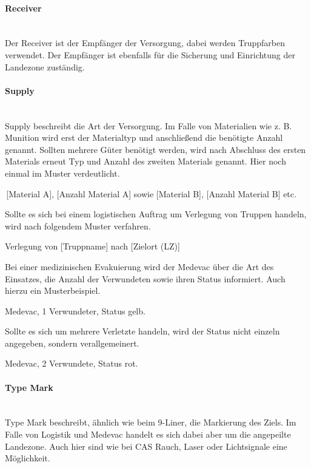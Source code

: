 \paragraph*{Receiver}\hfil\\
Der Receiver ist der Empfänger der Versorgung, dabei werden Truppfarben verwendet.
Der Empfänger ist ebenfalls für die Sicherung und Einrichtung der Landezone zuständig.
\paragraph*{Supply}\hfil\\
Supply beschreibt die Art der Versorgung. Im Falle von Materialien wie z. B. Munition wird
erst der Materialtyp und anschließend die benötigte Anzahl genannt. Sollten mehrere
Güter benötigt werden, wird nach Abschluss des ersten Materials erneut Typ und Anzahl
des zweiten Materials genannt. Hier noch einmal im Muster verdeutlicht.
\begin{hint}
\,[Material A], [Anzahl Material A] sowie [Material B], [Anzahl Material B] etc.
\end{hint}
Sollte es sich bei einem logistischen Auftrag um Verlegung von Truppen handeln, wird
nach folgendem Muster verfahren.
\begin{hint}
Verlegung von [Truppname] nach [Zielort (LZ)]
\end{hint}
Bei einer medizinischen Evakuierung wird der Medevac über die Art des Einsatzes, die
Anzahl der Verwundeten sowie ihren Status informiert. Auch hierzu ein Musterbeispiel.
\begin{hint}
Medevac, 1 Verwundeter, Status gelb.
\end{hint}
Sollte es sich um mehrere Verletzte handeln, wird der Status nicht einzeln angegeben,
sondern verallgemeinert.
\begin{hint}
Medevac, 2 Verwundete, Status rot.
\end{hint}
\paragraph*{Type Mark}\hfil\\
Type Mark beschreibt, ähnlich wie beim 9-Liner, die Markierung des Ziels. Im Falle von
Logistik und Medevac handelt es sich dabei aber um die angepeilte Landezone. Auch hier
sind wie bei CAS Rauch, Laser oder Lichtsignale eine Möglichkeit.
